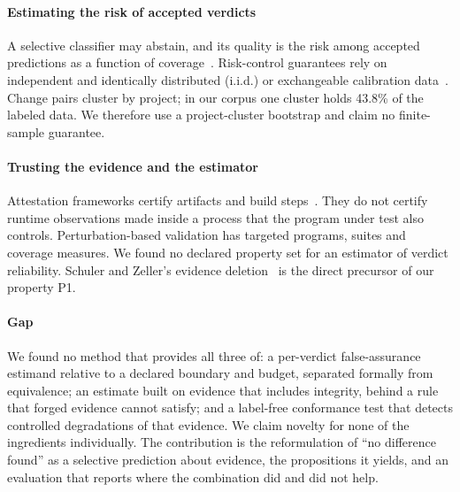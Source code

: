 \documentclass{ieeeaccess}
\begin{document}
\paragraph*{Estimating the risk of accepted verdicts} A selective classifier may abstain, and its quality is the risk among accepted predictions as a function of coverage~\cite{elyaniv2010foundations,geifman2017selective}. Risk-control guarantees rely on independent and identically distributed (i.i.d.) or exchangeable calibration data~\cite{bates2021distribution,angelopoulos2024conformal}. Change pairs cluster by project; in our corpus one cluster holds 43.8\% of the labeled data. We therefore use a project-cluster bootstrap and claim no finite-sample guarantee.

\paragraph*{Trusting the evidence and the estimator} Attestation frameworks certify artifacts and build steps~\cite{torresarias2019intoto,slsa2023spec,lamb2022reproducible}. They do not certify runtime observations made inside a process that the program under test also controls. Perturbation-based validation has targeted programs, suites and coverage measures. We found no declared property set for an estimator of verdict reliability. Schuler and Zeller's evidence deletion~\cite{schuler2011assessing} is the direct precursor of our property P1.

\paragraph*{Gap} We found no method that provides all three of: a per-verdict false-assurance estimand relative to a declared boundary and budget, separated formally from equivalence; an estimate built on evidence that includes integrity, behind a rule that forged evidence cannot satisfy; and a label-free conformance test that detects controlled degradations of that evidence. We claim novelty for none of the ingredients individually. The contribution is the reformulation of ``no difference found'' as a selective prediction about evidence, the propositions it yields, and an evaluation that reports where the combination did and did not help.


\end{document}
